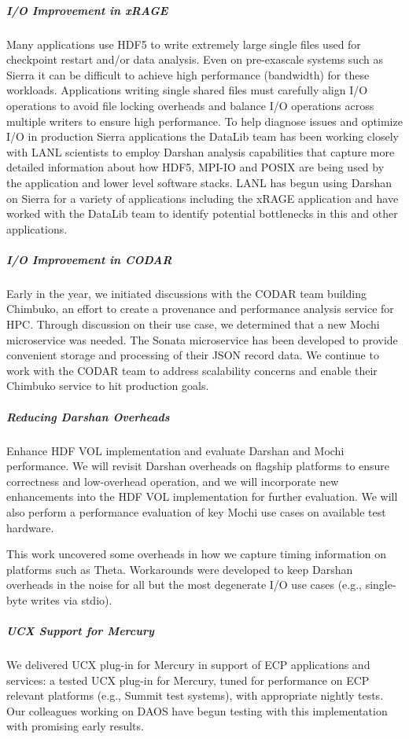\subparagraph{I/O Improvement in xRAGE}
Many applications use HDF5 to write extremely large
single files used for checkpoint restart and/or data analysis. Even on
pre-exascale systems such as Sierra it can be difficult to achieve high
performance (bandwidth) for these workloads. Applications writing single shared
files must carefully align I/O operations to avoid file locking overheads and
balance I/O operations across multiple writers to ensure high performance. To
help diagnose issues and optimize I/O in production Sierra applications the
DataLib team has been working closely with LANL scientists to employ Darshan
analysis capabilities that capture more detailed information about how HDF5,
MPI-IO and POSIX are being used by the application and lower level software
stacks. LANL has begun using Darshan on Sierra for a variety of applications
including the xRAGE application and have worked with the DataLib team to
identify potential bottlenecks in this and other applications.

\subparagraph{I/O Improvement in CODAR}
Early in the year, we initiated discussions with the CODAR team building
Chimbuko, an effort to create a provenance and performance analysis service for
HPC. Through discussion on their use case, we determined that a new Mochi
microservice was needed. The Sonata microservice has been developed to provide
convenient storage and processing of their JSON record data. We continue to work with
the CODAR team to address scalability concerns and enable their Chimbuko service
to hit production goals.

\subparagraph{Reducing Darshan Overheads} Enhance HDF VOL implementation and evaluate
Darshan and Mochi
performance. We will revisit Darshan overheads on flagship platforms to ensure
correctness and low-overhead operation, and we will incorporate new
enhancements into the HDF VOL implementation for further evaluation. We will
also perform a performance evaluation of key Mochi use cases on available test
hardware.

This work uncovered some overheads in how we capture timing information
on platforms such as Theta. Workarounds were developed to keep
Darshan overheads in the noise for all but the most degenerate I/O
use cases (e.g., single-byte writes via stdio).

\subparagraph{UCX Support for Mercury} We delivered UCX plug-in for Mercury
in support of ECP applications and services: a tested UCX plug-in
for Mercury, tuned for performance on ECP relevant platforms (e.g.,
Summit test systems), with appropriate nightly tests. Our colleagues
working on DAOS have begun testing with this implementation with
promising early results.

